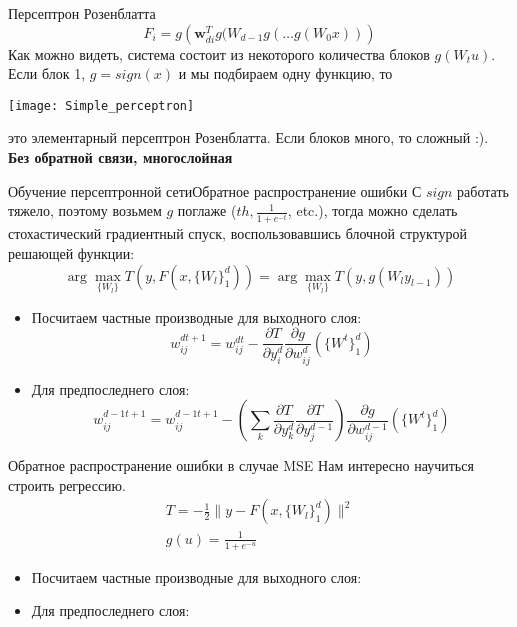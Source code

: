 \documentclass[14pt, fleqn, xcolor={dvipsnames, table}]{beamer}
\begin{document}
\begin{frame}{Персептрон Розенблатта}
\small
$$
F_i = g\left(\mathbf{w}_{di}^T g(W_{d-1}g(\ldots g(W_{0}x))\right)
$$
Как можно видеть, система состоит из некоторого количества блоков $g(W_tu)$. Если блок 1, $g = sign(x)$ и мы подбираем одну функцию, то
\begin{center}
\texttt{[image: Simple\_perceptron]}
\end{center}
это элементарный персептрон Розенблатта. Если блоков много, то сложный :).\\
\textbf{Без обратной связи, многослойная}
\end{frame}

\begin{frame}{Обучение персептронной сети}{Обратное распространение ошибки}
\footnotesize
С $sign$ работать тяжело, поэтому возьмем $g$ поглаже ($th, \frac{1}{1+e^{-t}}$, etc.), тогда можно сделать стохастический градиентный спуск, воспользовавшись блочной структурой решающей функции:
$$
\arg \max_{\{W_l\}} T(y, F(x, \{W_l\}_1^d)) = \arg\max_{\{W_l\}} T(y, g(W_l y_{l-1}))
$$
\begin{itemize}
  \item Посчитаем частные производные для выходного слоя:
  $$
  w_{ij}^{dt+1} = w_{ij}^{dt} - \frac{\partial T}{\partial y_i^d}\frac{\partial g}{\partial w_{ij}^d}\left(\{W^t\}_1^d\right)
  $$
  \item Для предпоследнего слоя:
  $$
  w_{ij}^{d-1t+1}  = w_{ij}^{d-1t+1} - \left(\sum_k \frac{\partial T}{\partial y_k^d}\frac{\partial T}{\partial y_j^{d-1}}\right)\frac{\partial g}{\partial w_{ij}^{d - 1}}\left(\{W^t\}_1^d\right)
  $$
  \end{itemize}
\end{frame}

\begin{frame}{Обратное распространение ошибки в случае MSE}
\footnotesize
Нам интересно научиться строить регрессию.
$$\begin{array}{c}
T = -\frac{1}{2}\|y - F(x, \{W_l\}_1^d)\|^2 \\
g(u) = \frac{1}{1 + e^{-u}}
\end{array}$$


\begin{itemize}
  \item Посчитаем частные производные для выходного слоя:
  \item Для предпоследнего слоя:
\end{itemize}
\end{frame}
\end{document}
